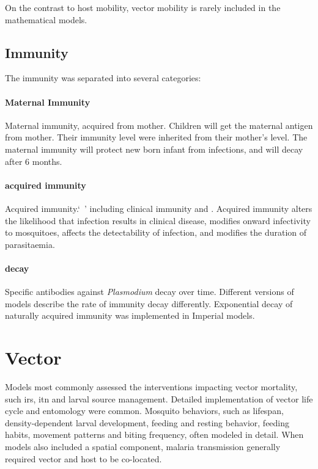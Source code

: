 \documentclass[a4paper, 12pt, twoside]{article}
\begin{document}
On the contrast to host mobility, vector mobility is rarely included in the mathematical models.

\subsection{Immunity}

The immunity was separated into several categories:

\paragraph{Maternal Immunity}%
\label{par:maternal_immunity}
Maternal immunity, acquired from mother. Children will get the maternal antigen from mother. Their immunity level were inherited from their mother's level. The maternal immunity will protect new born infant from infections, and will decay after 6 months.

\paragraph{acquired immunity}%
\label{par:acquired_immunity}
Acquired immunity.`\ ' including clinical immunity and .
Acquired immunity alters the likelihood that infection results in clinical disease, modifies onward infectivity to mosquitoes, affects the detectability of infection, and modifies the duration of parasitaemia.

\paragraph{decay}%
\label{par:decay}

Specific antibodies against \textit{Plasmodium} decay over time.
Different versions of models describe the rate of immunity decay differently.
Exponential decay of naturally acquired immunity was implemented in Imperial models.


\section{Vector}%
\label{sec:vector}
Models most commonly assessed the interventions impacting vector mortality, such \gls{irs}, \gls{itn} and larval source management.
Detailed implementation of vector life cycle and entomology were common.
Mosquito behaviors, such as lifespan, density-dependent larval development, feeding and resting behavior, feeding habits, movement patterns and biting frequency, often modeled in detail.
When models also included a spatial component, malaria transmission generally required vector and host to be co-located.
\end{document}
